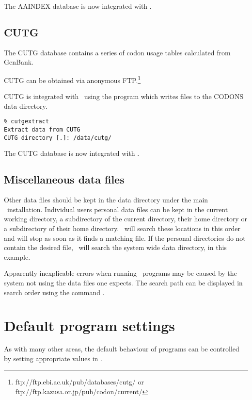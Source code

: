\documentclass{report}
\begin{document}
The AAINDEX database is now integrated with \EMBOSS.

\subsection{CUTG}

The CUTG database contains a series of codon usage tables calculated
from GenBank.

CUTG can be obtained via anonymous
FTP.\footnote{ftp://ftp.ebi.ac.uk/pub/databases/cutg/ or
ftp://ftp.kazusa.or.jp/pub/codon/current/}

CUTG is integrated with \EMBOSS\ using the program
 which writes files to the CODONS data
directory.

\begin{verbatim}
% cutgextract
Extract data from CUTG
CUTG directory [.]: /data/cutg/
\end{verbatim}

The CUTG database is now integrated with \EMBOSS.

\subsection{Miscellaneous data files}

Other data files should be kept in the data directory under the main
\EMBOSS\ installation. Individual users personal data files can be
kept in the current working directory, a subdirectory
 of the current directory, their home directory
or a subdirectory  of their home
directory. \EMBOSS\ will search these locations in this order and will
stop as soon as it finds a matching file. If the personal directories
do not contain the desired file, \EMBOSS\ will search the system wide
data directory,  in this example.

Apparently inexplicable errors when running \EMBOSS\ programs may be
caused by the system not using the data files one expects. The search
path can be displayed in search order using the command
.

\section{Default program settings}

As with many other areas, the default behaviour of programs can be
controlled by setting appropriate values in .
\end{document}
